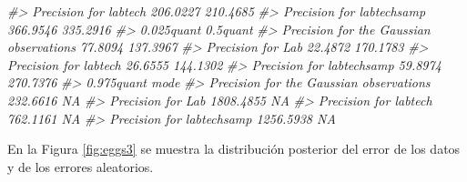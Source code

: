 \documentclass[
]{book}
\newenvironment{Shaded}{\begin{snugshade}}{\end{snugshade}}
\newcommand{\AttributeTok}[1]{\textcolor[rgb]{0.77,0.63,0.00}{#1}}
\newcommand{\CommentTok}[1]{\textcolor[rgb]{0.56,0.35,0.01}{\textit{#1}}}
\newcommand{\ConstantTok}[1]{\textcolor[rgb]{0.00,0.00,0.00}{#1}}
\newcommand{\ControlFlowTok}[1]{\textcolor[rgb]{0.13,0.29,0.53}{\textbf{#1}}}
\newcommand{\DecValTok}[1]{\textcolor[rgb]{0.00,0.00,0.81}{#1}}
\newcommand{\FunctionTok}[1]{\textcolor[rgb]{0.00,0.00,0.00}{#1}}
\newcommand{\NormalTok}[1]{#1}
\newcommand{\OtherTok}[1]{\textcolor[rgb]{0.56,0.35,0.01}{#1}}
\newcommand{\SpecialCharTok}[1]{\textcolor[rgb]{0.00,0.00,0.00}{#1}}
\newcommand{\StringTok}[1]{\textcolor[rgb]{0.31,0.60,0.02}{#1}}
\begin{document}
\begin{Shaded}
\begin{Highlighting}[]
\CommentTok{\#\textgreater{} Precision for labtech                   206.0227 210.4685}
\CommentTok{\#\textgreater{} Precision for labtechsamp               366.9546 335.2916}
\CommentTok{\#\textgreater{}                                         0.025quant 0.5quant}
\CommentTok{\#\textgreater{} Precision for the Gaussian observations    77.8094 137.3967}
\CommentTok{\#\textgreater{} Precision for Lab                          22.4872 170.1783}
\CommentTok{\#\textgreater{} Precision for labtech                      26.6555 144.1302}
\CommentTok{\#\textgreater{} Precision for labtechsamp                  59.8974 270.7376}
\CommentTok{\#\textgreater{}                                         0.975quant mode}
\CommentTok{\#\textgreater{} Precision for the Gaussian observations   232.6616   NA}
\CommentTok{\#\textgreater{} Precision for Lab                        1808.4855   NA}
\CommentTok{\#\textgreater{} Precision for labtech                     762.1161   NA}
\CommentTok{\#\textgreater{} Precision for labtechsamp                1256.5938   NA}
\end{Highlighting}
\end{Shaded}

En la Figura \ref{fig:eggs3} se muestra la distribución posterior del error de los datos y de los errores aleatorios.

\begin{Shaded}
\end{Shaded}
\end{document}
